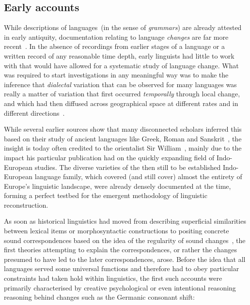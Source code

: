 \subsection{Early accounts}

While descriptions of languages~(in the sense of \emph{grammars}) are already attested in early antiquity, documentation relating to language \emph{changes} are far more recent~\citep[see][ch.I]{Jespersen1922}. In the absence of recordings from earlier stages of a language or a written record of any reasonable time depth, early linguists had little to work with that would have allowed for a systematic study of language change. %
What was required to start investigations in any meaningful way was to make the inference that \emph{dialectal} variation that can be observed for many languages was really a matter of variation that first occurred \emph{temporally} through local change, and which had then diffused across geographical space at different rates and in different directions~\citep{Chambers1998}.

While several earlier sources show that many disconnected scholars inferred this based on their study of ancient languages like Greek, Roman and Sanskrit~\citep[ch.II]{Jespersen1922},
the insight is today often credited to the orientalist Sir William~\citet{Jones1799}, mainly due to the impact his particular publication had on the quickly expanding field of Indo-European studies. The diverse varieties of the then still to be established Indo-European language family, which covered (and still cover) almost the entirety of Europe's linguistic landscape, were already densely documented at the time, forming a perfect testbed for the emergent methodology of linguistic reconstruction.

As soon as historical linguistics had moved from describing superficial similarities between lexical items or morphosyntactic constructions to positing concrete sound correspondences based on the idea of the regularity of sound changes~\citep{Paul1880}, the first theories attempting to explain the correspondences, or rather the changes presumed to have led to the later correspondences, arose. Before the idea that all languages served some universal functions and therefore had to obey particular constraints had taken hold within linguistics, the first such accounts were primarily characterised by creative psychological or even intentional reasoning reasoning behind changes such as the Germanic consonant shift:

